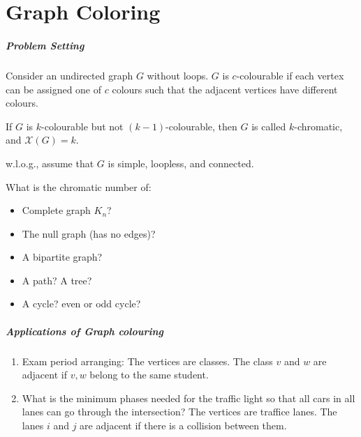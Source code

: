 \chapter{Graph Coloring}

\paragraph{Problem Setting}

\begin{definition}[Colourable]
Consider an undirected graph $G$ without loops.
$G$ is $c$-colourable if 
each vertex can be assigned one of $c$ colours such that
the adjacent vertices have different colours.
\end{definition}
\begin{definition}[Chromatic]
If $G$ is $k$-colourable but not $(k-1)$-colourable, then $G$ is called $k$-chromatic, and $\mathcal{X}(G)=k$.
\end{definition}
w.l.o.g., assume that $G$ is simple, loopless, and connected.

What is the chromatic number of:
\begin{itemize}
\item
Complete graph $K_n$?
\item
The null graph (has no edges)?
\item
A bipartite graph?
\item
A path? A tree?
\item
A cycle? even or odd cycle?
\end{itemize}


\paragraph{Applications of Graph colouring}
\begin{enumerate}
\item
Exam period arranging:
The vertices are classes. The class $v$ and $w$ are adjacent if $v,w$ belong to the same student.
\item
What is the minimum phases needed for the traffic light so that all cars in all lanes can go through the
intersection?
The vertices are traffice lanes. The lanes $i$ and $j$ are adjacent if there is a collision between them.
\end{enumerate}
